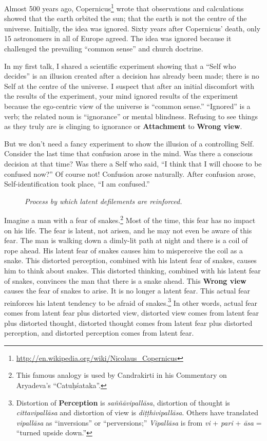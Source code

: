 Almost 500 years ago, Copernicus\footnote{\url{http://en.wikipedia.org/wiki/Nicolaus_Copernicus}} wrote that observations and calculations showed that the earth orbited the sun; that the earth is not the centre of the universe. Initially, the idea was ignored. Sixty years after Copernicus’ death, only 15 astronomers in all of Europe agreed. The idea was ignored because it challenged the prevailing “common sense” and church doctrine.

In my first talk, I shared a scientific experiment showing that a “Self who decides” is an illusion created after a decision has already been made; there is no Self at the centre of the universe. I suspect that after an initial discomfort with the results of the experiment, your mind ignored results of the experiment because the ego-centric view of the universe is “common sense.” “Ignored” is a verb; the related noun is “ignorance” or mental blindness. Refusing to see things as they truly are is clinging to ignorance or \textbf{Attachment} to \textbf{Wrong view}.

But we don’t need a fancy experiment to show the illusion of a controlling Self. Consider the last time that confusion arose in the mind. Was there a conscious decision at that time? Was there a Self who said, “I think that I will choose to be confused now?” Of course not! Confusion arose naturally. After confusion arose, Self-identification took place, “I am confused.”

\begin{figure}[h]
\centering

\caption{\textit{\small Process by which latent defilements are reinforced.}}
\label{fig:Latent}
\end{figure}

Imagine a man with a fear of snakes.\footnote{This famous analogy is used by Candrakirti in his Commentary on Aryadeva’s “Catuḥśataka”.} Most of the time, this fear has no impact on his life. The fear is latent, not arisen, and he may not even be aware of this fear. The man is walking down a dimly-lit path at night and there is a coil of rope ahead. His latent fear of snakes causes him to misperceive the coil as a snake. This distorted perception, combined with his latent fear of snakes, causes him to think about snakes. This distorted thinking, combined with his latent fear of snakes, convinces the man that there is a snake ahead. This \textbf{Wrong view} causes the fear of snakes to arise. It is no longer a latent fear. This actual fear reinforces his latent tendency to be afraid of snakes.\footnote{Distortion of \textbf{Perception} is \textit{saññāvipallāsa}, distortion of thought is \textit{cittavipallāsa} and distortion of view is \textit{diṭṭhivipallāsa}. Others have translated \textit{vipallāsa} as “inversions” or “perversions;” \textit{Vipallāsa} is from \textit{vi} + \textit{pari} + \textit{āsa} = “turned upside down.”} In other words, actual fear comes from latent fear plus distorted view, distorted view comes from latent fear plus distorted thought, distorted thought comes from latent fear plus distorted perception, and distorted perception comes from latent fear.


